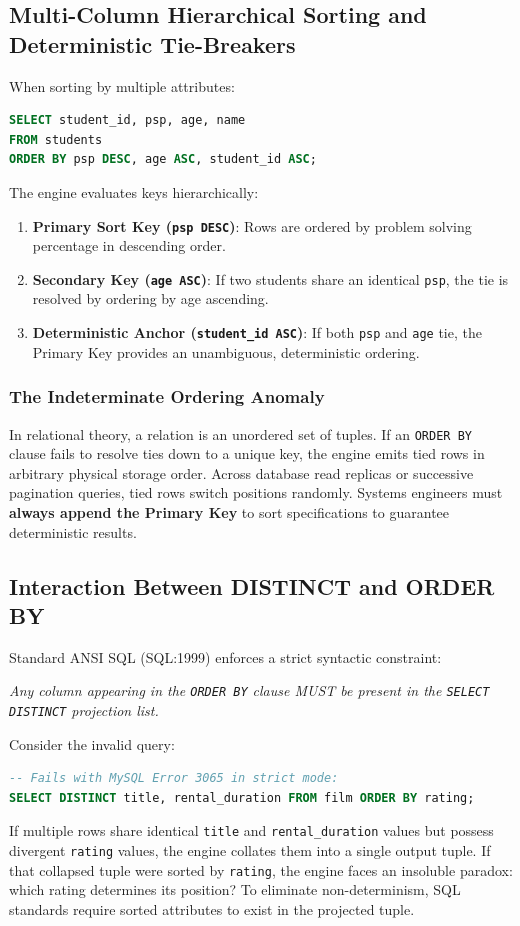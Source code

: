 \documentclass[10pt,twocolumn,letterpaper]{article}
\begin{document}
\subsection{Multi-Column Hierarchical Sorting and Deterministic Tie-Breakers}
When sorting by multiple attributes:
\begin{lstlisting}[language=SQL]
SELECT student_id, psp, age, name 
FROM students 
ORDER BY psp DESC, age ASC, student_id ASC;
\end{lstlisting}
The engine evaluates keys hierarchically:
\begin{enumerate}
    \item \textbf{Primary Sort Key (\texttt{psp DESC})}: Rows are ordered by problem solving percentage in descending order.
    \item \textbf{Secondary Key (\texttt{age ASC})}: If two students share an identical \texttt{psp}, the tie is resolved by ordering by age ascending.
    \item \textbf{Deterministic Anchor (\texttt{student\_id ASC})}: If both \texttt{psp} and \texttt{age} tie, the Primary Key provides an unambiguous, deterministic ordering.
\end{enumerate}

\subsubsection{The Indeterminate Ordering Anomaly}
In relational theory, a relation is an unordered set of tuples. If an \texttt{ORDER BY} clause fails to resolve ties down to a unique key, the engine emits tied rows in arbitrary physical storage order. Across database read replicas or successive pagination queries, tied rows switch positions randomly. Systems engineers must \textbf{always append the Primary Key} to sort specifications to guarantee deterministic results.

\subsection{Interaction Between DISTINCT and ORDER BY}
Standard ANSI SQL (SQL:1999) enforces a strict syntactic constraint:
\begin{center}
\textit{Any column appearing in the \texttt{ORDER BY} clause MUST be present in the \texttt{SELECT DISTINCT} projection list.}
\end{center}
Consider the invalid query:
\begin{lstlisting}[language=SQL]
-- Fails with MySQL Error 3065 in strict mode:
SELECT DISTINCT title, rental_duration FROM film ORDER BY rating;
\end{lstlisting}
If multiple rows share identical \texttt{title} and \texttt{rental\_duration} values but possess divergent \texttt{rating} values, the engine collates them into a single output tuple. If that collapsed tuple were sorted by \texttt{rating}, the engine faces an insoluble paradox: which rating determines its position? To eliminate non-determinism, SQL standards require sorted attributes to exist in the projected tuple.
\end{document}
